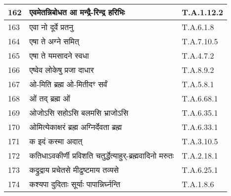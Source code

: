 \documentclass[17pt]{extarticle}
\begin{document}
\begin{longtable}{||p{0.4in}||p{4.9in}||p{0.9in}||}
    \hline
        
    162 & एवमेतन्निबोधत आ मन्द्रै{-}रिन्द्र हरिभिः & T.A.1.12.2       \\
    
    \hline
        
    163 & एवा नो दूर्वे प्रतनु & T.A.6.1.8       \\
    
    \hline
        
    164 & एषा ते अग्ने समित् & T.A.7.10.5       \\
    
    \hline
        
    165 & एषा ते यमसादने स्वधा & T.A.4.7.2       \\
    
    \hline
        
    166 & एष्वेव लोकेषु प्रजा दाधार & T.A.8.9.2       \\
    
    \hline
        
    167 & ओ{-}मिति ब्रह्म ओ{-}मितीदꣳ सर्वं & T.A.5.8.1       \\
    
    \hline
        
    168 & ओं तद् ब्रह्म ओं & T.A.6.68.1       \\
    
    \hline
        
    169 & ओजोऽसि सहोऽसि बलमसि भ्राजोऽसि & T.A.6.35.1       \\
    
    \hline
        
    170 & ओमित्येकाक्षरं ब्रह्म अग्निर्देवता ब्रह्म & T.A.6.33.1       \\
    
    \hline
        
    171 & क इदं कस्मा अदात् & T.A.3.10.5       \\
    
    \hline
        
    172 & कतिधाऽवकीर्णी प्रविशति चतुर्द्धेत्याहुर्{-}ब्रह्मवादिनो मरुतः & T.A.2.18.1       \\
    
    \hline
        
    173 & कद्रुद्राय प्रचेतसे मीढुष्टमाय तव्यसे & T.A.6.25.1       \\
    
    \hline
        
    174 & कश्यपा दुदिताः सूर्याः पापान्निर्घ्नन्ति & T.A.1.8.6       \\
    

\end{longtable}
\end{document}
